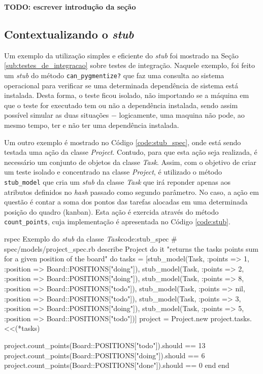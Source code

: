 \textbf{TODO: escrever introdução da seção}

\subsection{Contextualizando o \textit{stub}}
\label{sub:contextualizando_o_stub}

Um exemplo da utilização simples e eficiente do \textit{stub} foi mostrado na Seção \ref{sub:testes_de_integracao} sobre testes de integração. Naquele exemplo, foi feito um \textit{stub} do método \texttt{can\_pygmentize?} que faz uma consulta ao sistema operacional para verificar se uma determinada dependência de sistema está instalada. Desta forma, o teste ficou isolado, não importando se a máquina em que o teste for executado tem ou não a dependência instalada, sendo assim possível simular as duas situações $-$ logicamente, uma maquina não pode, ao mesmo tempo, ter e não ter uma dependência instalada.

Um outro exemplo é mostrado no Código \ref{code:stub_spec}, onde está sendo testada uma ação da classe \textit{Project}. Contudo, para que esta ação seja realizada, é necessário um conjunto de objetos da classe \textit{Task}. Assim, com o objetivo de criar um teste isolado e concentrado na classe \textit{Project}, é utilizado o método \texttt{stub\_model} que cria um \textit{stub} da classe \textit{Task} que irá reponder apenas aos atributos definidos no \textit{hash} passado como segundo parâmetro. No caso, a ação em questão é contar a soma dos pontos das tarefas alocadas em uma determinada posição do quadro (kanban). Esta ação é exercida através do método \texttt{count\_points}, cuja implementação é apresentada no Código \ref{code:stub}.

\begin{mycode}{rspec}%
{Exemplo do \textit{stub} da classe \textit{Task}}{code:stub_spec}
# spec/models/project_spec.rb
describe Project do
  it "returns the tasks points sum for a given position of the board" do
    tasks = [stub_model(Task, :points => 1, :position => Board::POSITIONS["doing"]),
             stub_model(Task, :points => 2, :position => Board::POSITIONS["doing"]),
             stub_model(Task, :points => 8, :position => Board::POSITIONS["todo"]),
             stub_model(Task, :points => nil, :position => Board::POSITIONS["todo"]),
             stub_model(Task, :points => 3, :position => Board::POSITIONS["doing"]),
             stub_model(Task, :points => 5, :position => Board::POSITIONS["todo"])]
    project = Project.new
    project.tasks.<<(*tasks)

    project.count_points(Board::POSITIONS["todo"]).should == 13
    project.count_points(Board::POSITIONS["doing"]).should == 6
    project.count_points(Board::POSITIONS["done"]).should == 0
  end
end
\end{mycode}

